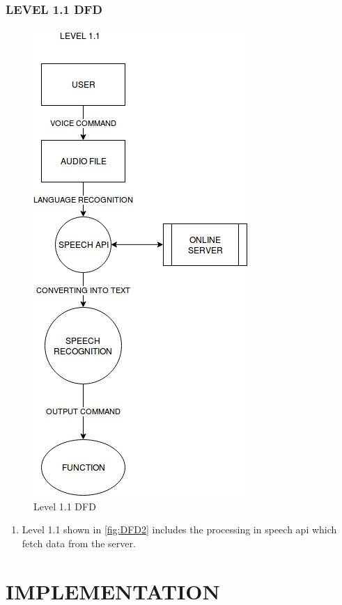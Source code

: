 \documentclass[12pt]{report} %
\begin{document}
\subsection{LEVEL 1.1 DFD}
\label{subsec:LEVEL 2 DFD}
\begin{figure}[h]
	\centering
	\includegraphics[width=0.5\linewidth]{figures/DFD2.jpg}
	\caption{Level 1.1 DFD}
	\label{fig:DFD2}
\end{figure}

\begin{enumerate}
	\item Level 1.1 shown in \autoref{fig:DFD2} includes the processing in speech api which fetch data from the server.
\end{enumerate}

%


\chapter{IMPLEMENTATION}
\end{document}
